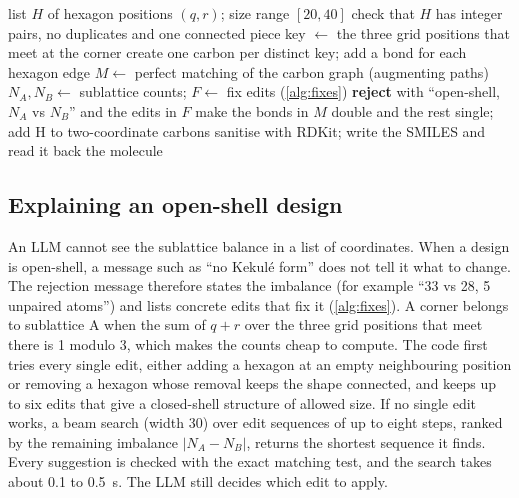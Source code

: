 \begin{algorithm}[ht]
  \caption{Hexagon list to molecule ()}
  \label{alg:hex2mol}
  \begin{algorithmic}[1]
    \Require list \(H\) of hexagon positions \((q,r)\); size range \([20,40]\)
    \State check that \(H\) has integer pairs, no duplicates and one connected piece
      \State key \(\gets\) the three grid positions that meet at the corner
      \State create one carbon per distinct key; add a bond for each hexagon edge
    \EndFor
    \State \(M \gets\) perfect matching of the carbon graph (augmenting paths)
      \State \(N_A, N_B \gets\) sublattice counts; \(F \gets\) fix edits (\cref{alg:fixes})
      \State \textbf{reject} with ``open-shell, \(N_A\) vs \(N_B\)'' and the edits in \(F\)
    \EndIf
    \State make the bonds in \(M\) double and the rest single; add H to two-coordinate carbons
    \State sanitise with RDKit; write the SMILES and read it back 
    \State \Return the molecule
  \end{algorithmic}
\end{algorithm}

\subsection{Explaining an open-shell design}

An LLM cannot see the sublattice balance in a list of coordinates. When a design is open-shell, a
message such as ``no Kekul\'e form'' does not tell it what to change. The rejection message
therefore states the imbalance (for example ``33 vs 28, 5 unpaired atoms'') and lists concrete
edits that fix it (\cref{alg:fixes}). A corner belongs to sublattice A when the sum of \(q+r\) over
the three grid positions that meet there is 1 modulo 3, which makes the counts cheap to compute.
The code first tries every single edit, either adding a hexagon at an empty neighbouring position
or removing a hexagon whose removal keeps the shape connected, and keeps up to six edits that give
a closed-shell structure of allowed size. If no single edit works, a beam search (width 30) over
edit sequences of up to eight steps, ranked by the remaining imbalance \(|N_A-N_B|\), returns the
shortest sequence it finds. Every suggestion is checked with the exact matching test, and the
search takes about 0.1 to 0.5~s. The LLM still decides which edit to apply.

